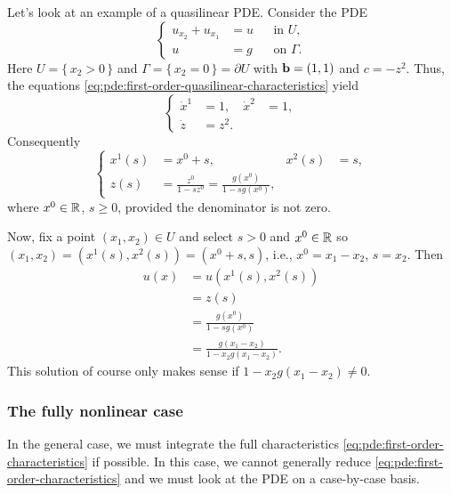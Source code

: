 \begin{example}
  Let's look at an example of a quasilinear PDE. Consider the PDE
  \[
    \tag{\(*\)}
    \left\{
      \begin{aligned}
        u_{x_2}+u_{x_1}&=u&&\text{in \(U\),}\\
        u&=g&&\text{on \(\Gamma\).}
      \end{aligned}
    \right.
  \]
  Here \(U=\{\,x_2>0\,\}\) and \(\Gamma=\{\,x_2=0\,\}=\partial U\) with
  \(\mathbf{b}=(1,1)\) and \(c=-z^2\). Thus, the equations
  \eqref{eq:pde:first-order-quasilinear-characteristics} yield
  \[
    \left\{
      \begin{aligned}
        \dot x^1&=1,&\dot x^2&=1,\\
        \dot z&=z^2.
      \end{aligned}
    \right.
  \]
  Consequently
  \[
    \left\{
      \begin{aligned}
        x^1(s)&=x^0+s,&x^2(s)&=s,\\
        z(s)&=\frac{z^0}{1-sz^0}=\frac{g(x^0)}{1-sg(x^0)},
      \end{aligned}
    \right.
  \]
  where \(x^0\in\mathbb{R}\), \(s\geq 0\), provided the denominator is not zero.

  Now, fix a point \((x_1,x_2)\in U\) and select \(s>0\) and \(x^0\in\mathbb{R}\)
  so \((x_1,x_2)=(x^1(s),x^2(s))=(x^0+s,s)\), i.e., \(x^0=x_1-x_2\),
  \(s=x_2\). Then
  \begin{align*}
    u(x)&=u(x^1(s),x^2(s))\\
        &=z(s)\\
        &=\frac{g(x^0)}{1-sg(x^0)}\\
        &=\frac{g(x_1-x_2)}{1-x_2g(x_1-x_2)}.
  \end{align*}
  This solution of course only makes sense if \(1-x_2g(x_1-x_2)\neq 0\).
\end{example}

\subsubsection{The fully nonlinear case}
In the general case, we must integrate the full characteristics
\eqref{eq:pde:first-order-characteristics} if possible. In this case, we
cannot generally reduce \eqref{eq:pde:first-order-characteristics} and we
must look at the PDE on a case-by-case basis.

